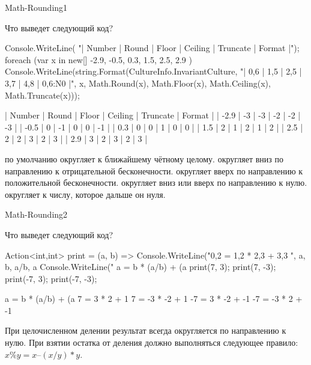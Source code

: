 \begin{defproblem}{Math-Rounding1}
\begin{onlyproblem}
  Что выведет следующий код?
  \begin{source}
  Console.WriteLine(
    "| Number | Round | Floor | Ceiling | Truncate | Format |");
  foreach (var x in new[] { -2.9, -0.5, 0.3, 1.5, 2.5, 2.9 })
  {
    Console.WriteLine(string.Format(CultureInfo.InvariantCulture,
      "| {0,6} | {1,5} | {2,5} | {3,7} | {4,8} | {0,6:N0} |",
      x, Math.Round(x), Math.Floor(x), 
      Math.Ceiling(x), Math.Truncate(x)));
  }
  \end{source}
\end{onlyproblem}
\begin{onlysolution}
  \begin{source}
  | Number | Round | Floor | Ceiling | Truncate | Format |
  |   -2.9 |    -3 |    -3 |      -2 |       -2 |     -3 |
  |   -0.5 |     0 |    -1 |       0 |        0 |     -1 |
  |    0.3 |     0 |     0 |       1 |        0 |      0 |
  |    1.5 |     2 |     1 |       2 |        1 |      2 |
  |    2.5 |     2 |     2 |       3 |        2 |      3 |
  |    2.9 |     3 |     2 |       3 |        2 |      3 |
  \end{source}
   по умолчанию округляет к ближайшему чётному целому.\newline
   округляет вниз по направлению к отрицательной бесконечности.\newline
   округляет вверх по направлению к положительной бесконечности.\newline
   округляет вниз или вверх по направлению к нулю.\newline
   округляет к числу, которое дальше он нуля.
\end{onlysolution}
\end{defproblem}
\begin{defproblem}{Math-Rounding2}
\begin{onlyproblem}
  Что выведет следующий код?
  \begin{source}
  Action<int,int> print = (a, b) =>
    Console.WriteLine("{0,2} = {1,2} * {2,3}   + {3,3}  ",
                      a, b, a/b, a%
  Console.WriteLine(" a =  b * (a/b) + (a%
  print(7, 3);
  print(7, -3);
  print(-7, 3);
  print(-7, -3);
  \end{source}
\end{onlyproblem}
\begin{onlysolution}
  \begin{source}
   a =  b * (a/b) + (a%
   7 =  3 *   2   +   1  
   7 = -3 *  -2   +   1  
  -7 =  3 *  -2   +  -1  
  -7 = -3 *   2   +  -1  
  \end{source}
  При целочисленном делении результат всегда округляется по направлению к нулю.
  При взятии остатка от деления должно выполняться следующее правило: $x \% y = x – (x / y) * y$.
\end{onlysolution}
\end{defproblem}
